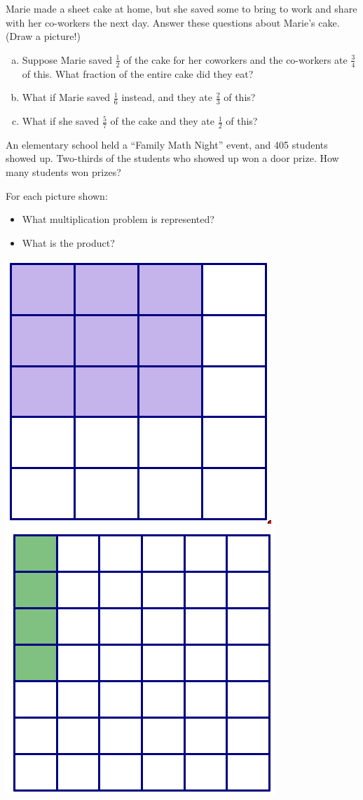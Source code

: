 \begin{problem}
Marie made a sheet cake at home, but she saved some to bring to work and share with her co-workers the next day.  Answer these questions about Marie's cake.  (Draw a picture!)
\begin{enumerate}[(a)]
\item
Suppose Marie saved $\frac 1 2$ of the cake for her coworkers and the co-workers ate $\frac 3 4$  of this. What fraction of the entire cake did they eat?\\
\item
    What if Marie saved $\frac 1 6$ instead, and they ate $\frac 2 3$ of this?\\
    \item
    What if she saved $\frac 5 7$ of the cake and they ate $\frac 1 2$ of this?\\
    \end{enumerate}
 
\end{problem}





 \begin{problem}
An elementary school held a ``Family Math Night'' event, and 405 students showed up.  Two-thirds of the students who showed up won a door prize.  How many students won prizes?
\end{problem}


\begin{problem}
For each picture shown:
\begin{itemize}
\item
What multiplication problem is represented?
\item
What is the product?
\end{itemize}

\begin{center}
\includegraphics[height=3.5 cm]{FracMult2}
\qquad\qquad\qquad
\includegraphics[height=3.5 cm]{FracMult3}
\end{center}
\end{problem}





